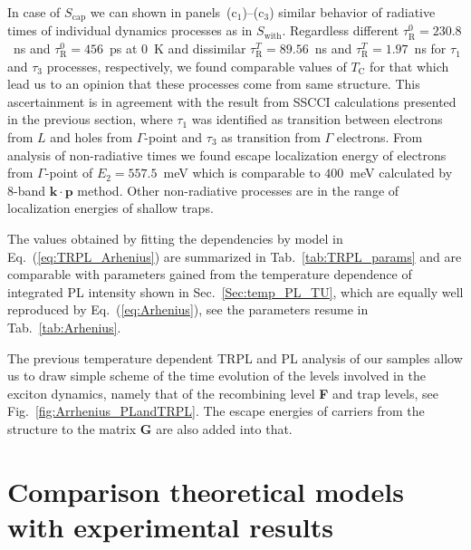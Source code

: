 In case of $S_\mathrm{cap}$ we can shown in panels~(c$_1$)--(c$_3$) similar behavior of radiative times of individual dynamics processes as in $S_\mathrm{with}$. Regardless different $\tau_\mathrm{R}^0=230.8$~ns and $\tau_\mathrm{R}^0=456$~ps at 0~K and dissimilar $\tau_\mathrm{R}^T=89.56$~ns and $\tau_\mathrm{R}^T=1.97$~ns for $\tau_1$ and $\tau_3$ processes, respectively, we found comparable values of $T_\mathrm{C}$ for that which lead us to an opinion that these processes come from same structure. This ascertainment is in agreement with the result from SSCCI calculations presented in the previous section, where $\tau_1$ was identified as transition between electrons from $L$ and holes from $\Gamma$-point and $\tau_3$ as transition from $\Gamma$ electrons. From analysis of non-radiative times we found escape localization energy of electrons from $\Gamma$-point of $E_2=557.5$~meV which is comparable to $400$~meV calculated by 8-band $\mathbf{k \cdot p}$ method. Other non-radiative processes are in the range of localization energies of shallow traps.



The values obtained by fitting the dependencies by model in Eq.~(\ref{eq:TRPL_Arhenius}) are summarized in Tab.~\ref{tab:TRPL_params} and are comparable with parameters gained from the temperature dependence of integrated PL intensity shown in Sec.~\ref{Sec:temp_PL_TU}, which are equally well reproduced by Eq.~(\ref{eq:Arhenius}), see the parameters resume in Tab.~\ref{tab:Arhenius}.

The previous temperature dependent TRPL and PL analysis of our samples allow us to draw simple scheme of the time evolution of the levels involved in the exciton dynamics, namely that of the recombining level \textbf{F} and trap levels, see Fig.~\ref{fig:Arrhenius_PLandTRPL}. The escape energies of carriers from the structure to the matrix \textbf{G} are also added into that. 


\section{Comparison theoretical models with experimental results} \label{sec:TUB_results}

